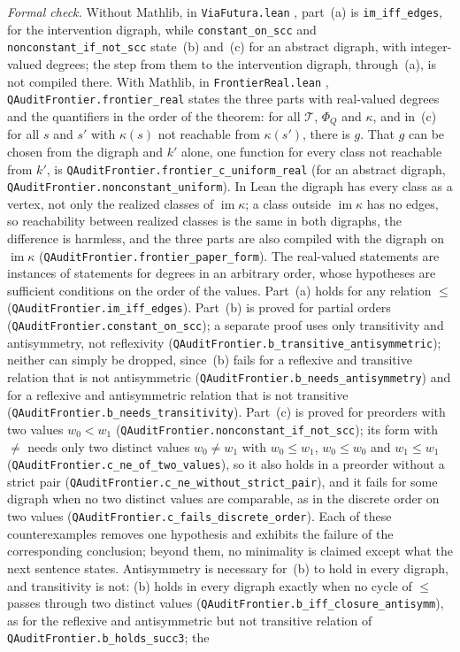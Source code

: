 \emph{Formal check.} Without Mathlib, in \texttt{ViaFutura.lean} \stL, part~(a) is \texttt{im\_iff\_edges}, for the intervention digraph, while \texttt{constant\_on\_scc} and \texttt{nonconstant\_if\_not\_scc} state~(b) and~(c) for an abstract digraph, with integer-valued degrees; the step from them to the intervention digraph, through~(a), is not compiled there. With Mathlib, in \texttt{FrontierReal.lean} \stM, \texttt{QAuditFrontier.\allowbreak frontier\_real} states the three parts with real-valued degrees and the quantifiers in the order of the theorem: for all $\mathcal T$, $\Phi_Q$ and $\kappa$, and in~(c) for all $s$ and $s'$ with $\kappa(s)$ not reachable from $\kappa(s')$, there is $g$. That $g$ can be chosen from the digraph and $k'$ alone, one function for every class not reachable from $k'$, is \texttt{QAuditFrontier.\allowbreak frontier\_c\_uniform\_real} (for an abstract digraph, \texttt{QAuditFrontier.\allowbreak nonconstant\_uniform}). In Lean the digraph has every class as a vertex, not only the realized classes of $\operatorname{im}\kappa$; a class outside $\operatorname{im}\kappa$ has no edges, so reachability between realized classes is the same in both digraphs, the difference is harmless, and the three parts are also compiled with the digraph on $\operatorname{im}\kappa$ (\texttt{QAuditFrontier.\allowbreak frontier\_paper\_form}). The real-valued statements are instances of statements for degrees in an arbitrary order, whose hypotheses are sufficient conditions on the order of the values. Part~(a) holds for any relation $\le$ (\texttt{QAuditFrontier.\allowbreak im\_iff\_edges}). Part~(b) is proved for partial orders (\texttt{QAuditFrontier.\allowbreak constant\_on\_scc}); a separate proof uses only transitivity and antisymmetry, not reflexivity (\texttt{QAuditFrontier.\allowbreak b\_transitive\_antisymmetric}); neither can simply be dropped, since~(b) fails for a reflexive and transitive relation that is not antisymmetric (\texttt{QAuditFrontier.\allowbreak b\_needs\_antisymmetry}) and for a reflexive and antisymmetric relation that is not transitive (\texttt{QAuditFrontier.\allowbreak b\_needs\_transitivity}). Part~(c) is proved for preorders with two values $w_0<w_1$ (\texttt{QAuditFrontier.\allowbreak nonconstant\_if\_not\_scc}); its form with $\ne$ needs only two distinct values $w_0\ne w_1$ with $w_0\le w_1$, $w_0\le w_0$ and $w_1\le w_1$ (\texttt{QAuditFrontier.\allowbreak c\_ne\_of\_two\_values}), so it also holds in a preorder without a strict pair (\texttt{QAuditFrontier.\allowbreak c\_ne\_without\_strict\_pair}), and it fails for some digraph when no two distinct values are comparable, as in the discrete order on two values (\texttt{QAuditFrontier.\allowbreak c\_fails\_discrete\_order}). Each of these counterexamples removes one hypothesis and exhibits the failure of the corresponding conclusion; beyond them, no minimality is claimed except what the next sentence states. Antisymmetry is necessary for~(b) to hold in every digraph, and transitivity is not: (b) holds in every digraph exactly when no cycle of $\le$ passes through two distinct values (\texttt{QAuditFrontier.\allowbreak b\_iff\_closure\_antisymm}), as for the reflexive and antisymmetric but not transitive relation of \texttt{QAuditFrontier.\allowbreak b\_holds\_succ3}; the 